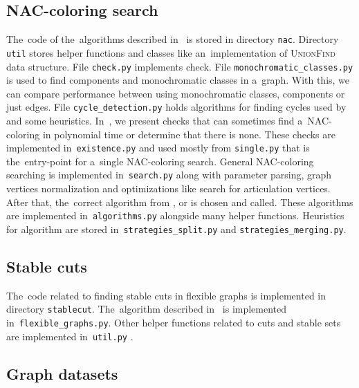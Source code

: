 \subsection{NAC-coloring search}

The~code of the~algorithms described in~
is stored in directory \texttt{nac}.
%
Directory \texttt{util} stores helper functions and classes
like an~implementation of \textsc{UnionFind} data structure.
%
File \texttt{check.py} implements \IsNACColoring{} check.
%
File \texttt{monochromatic\_classes.py} is used to find \trcon{} components
and monochromatic classes in a~graph. With this, we can compare performance
between using monochromatic classes, \trcon{} components or just edges.
%
File \texttt{cycle\_detection.py} holds algorithms for finding cycles
used by 
and some heuristics.
%
In~,
we present checks that can
sometimes find a~NAC-coloring in polynomial time
or determine that there is none.
These checks are implemented in~\texttt{existence.py} and
used mostly from \texttt{single.py} that is the~entry-point
for a~single NAC-coloring search.
%
General NAC-coloring searching is implemented in~\texttt{search.py}
along with parameter parsing, graph vertices normalization and
optimizations like search for articulation vertices.
After that, the~correct algorithm from \Naive{}, \NaiveCycles{} or \Subgraphs{}
is chosen and called.
%
These algorithms are implemented in~\texttt{algorithms.py} alongside many helper functions.
Heuristics for \Subgraphs{} algorithm are stored in~\texttt{strategies\_split.py}
and \texttt{strategies\_merging.py}.


\subsection{Stable cuts}

The~code related to finding stable cuts in flexible graphs
is implemented in directory \texttt{stablecut}.
%
The~algorithm described in~
is implemented in~\texttt{flexible\_graphs.py}.
Other helper functions related to cuts and stable sets
are implemented in~\texttt{util.py}%
.


\subsection{Graph datasets}

